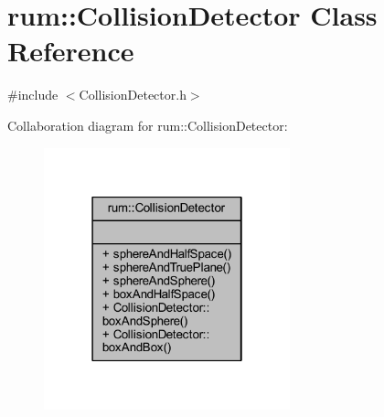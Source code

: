 \hypertarget{classrum_1_1_collision_detector}{}\section{rum\+:\+:Collision\+Detector Class Reference}
\label{classrum_1_1_collision_detector}


{\ttfamily \#include $<$Collision\+Detector.\+h$>$}



Collaboration diagram for rum\+:\+:Collision\+Detector\+:\nopagebreak
\begin{figure}[H]
\begin{center}
\leavevmode
\includegraphics[width=202pt]{classrum_1_1_collision_detector__coll__graph}
\end{center}
\end{figure}
